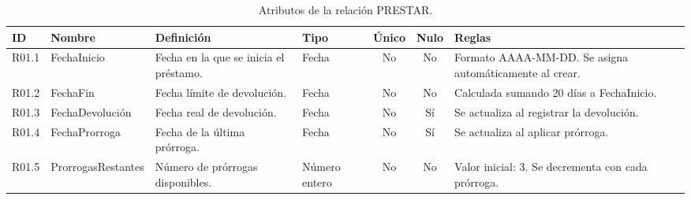 \begin{table}[H]
	\centering
	\caption{Atributos de la relación PRESTAR.}
	\label{tab:dict_atributos_prestar}
	\small
	\begin{tabularx}{\textwidth}{l l X l c c X}
		\toprule
		\textbf{ID} & \textbf{Nombre} & \textbf{Definición} & \textbf{Tipo} & \textbf{Único} & \textbf{Nulo} & \textbf{Reglas} \\
		\midrule
		R01.1 & FechaInicio & Fecha en la que se inicia el préstamo. & Fecha & No & No & Formato AAAA-MM-DD. Se asigna automáticamente al crear. \\
		\addlinespace
		R01.2 & FechaFin & Fecha límite de devolución. & Fecha & No & No & Calculada sumando 20 días a FechaInicio. \\
		\addlinespace
		R01.3 & FechaDevolución & Fecha real de devolución. & Fecha & No & Sí & Se actualiza al registrar la devolución. \\
		\addlinespace
		R01.4 & FechaProrroga & Fecha de la última prórroga. & Fecha & No & Sí & Se actualiza al aplicar prórroga. \\
		\addlinespace
		R01.5 & ProrrogasRestantes & Número de prórrogas disponibles. & Número entero & No & No & Valor inicial: 3. Se decrementa con cada prórroga. \\
		\bottomrule
	\end{tabularx}
\end{table}